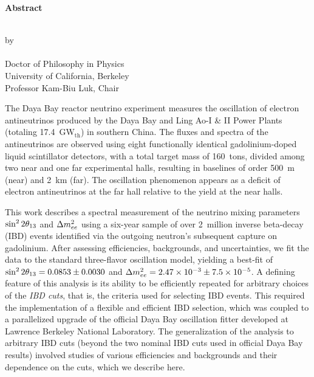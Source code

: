 \MyDoubleSpacing

\begin{center}
  \mylarge
  \textbf{Abstract}

  \vspace{1.5\baselineskip}
  \MyTitle\\
  \vspace{\baselineskip} by\\
  \vspace{\baselineskip} \MyAuthor\\
  Doctor of Philosophy in Physics\\
  University of California, Berkeley\\
  Professor Kam-Biu Luk, Chair
  \vspace{\baselineskip}
\end{center}

\normalsize
\MyDoubleSpacing
\noindent
%
The Daya Bay reactor neutrino experiment measures the oscillation of electron antineutrinos produced by the Daya Bay and Ling Ao-I \& II Power Plants (totaling 17.4~GW$_\mathrm{th}$) in southern China. The fluxes and spectra of the antineutrinos are observed using eight functionally identical gadolinium-doped liquid scintillator detectors, with a total target mass of 160~tons, divided among two near and one far experimental halls, resulting in baselines of order 500~m (near) and 2~km (far). The oscillation phenomenon appears as a deficit of electron antineutrinos at the far hall relative to the yield at the near halls.

This work describes a spectral measurement of the neutrino mixing parameters $\sin^2 2\theta_{13}$ and $\Delta m^2_{ee}$ using a six-year sample of over 2~million inverse beta-decay (IBD) events identified via the outgoing neutron's subsequent capture on gadolinium. After assessing efficiencies, backgrounds, and uncertainties, we fit the data to the standard three-flavor oscillation model, yielding a best-fit of $\sin^2 2\theta_{13} = 0.0853 \pm 0.0030$ and $\Delta m^2_{ee} = 2.47\times10^{-3} \pm 7.5\times10^{-5}$. A defining feature of this analysis is its ability to be efficiently repeated for arbitrary choices of the \emph{IBD cuts}, that is, the criteria used for selecting IBD events. This required the implementation of a flexible and efficient IBD selection, which was coupled to a parallelized upgrade of the official Daya Bay oscillation fitter developed at Lawrence Berkeley National Laboratory. The generalization of the analysis to arbitrary IBD cuts (beyond the two nominal IBD cuts used in official Daya Bay results) involved studies of various efficiencies and backgrounds and their dependence on the cuts, which we describe here.

